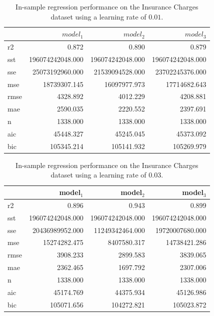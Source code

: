 \documentclass[11pt]{article}
\begin{document}
\begin{table}[H]
\centering
\caption{In-sample regression performance on the Insurance Charges dataset using a learning rate of $0.01$.}
\label{tab:California_Housing_(In-Sample)}
\begin{tabular}{lrrr}
\toprule
 & $model_1$ & $model_2$ & $model_3$ \\
\midrule
r2 & 0.872 & 0.890 & 0.879 \\
sst & 196074242048.000 & 196074242048.000 & 196074242048.000 \\
sse & 25073192960.000 & 21539094528.000 & 23702245376.000 \\
mse & 18739307.145 & 16097977.973 & 17714682.643 \\
rmse & 4328.892 & 4012.229 & 4208.881 \\
mae & 2590.035 & 2220.552 & 2397.691 \\
n & 1338.000 & 1338.000 & 1338.000 \\
aic & 45448.327 & 45245.045 & 45373.092 \\
bic & 105345.214 & 105141.932 & 105269.979 \\
\bottomrule
\end{tabular}
\end{table}


\begin{table}[H]
\centering
\caption{In-sample regression performance on the Insurance Charges dataset using a learning rate of $0.03$.}
\label{tab:Auto_MPG_(In-Sample)}
\begin{tabular}{lrrr}
\toprule
 & model$_1$ & model$_2$ & model$_3$ \\
\midrule
r2 & 0.896 & 0.943 & 0.899 \\
sst & 196074242048.000 & 196074242048.000 & 196074242048.000 \\
sse & 20436989952.000 & 11249342464.000 & 19720007680.000 \\
mse & 15274282.475 & 8407580.317 & 14738421.286 \\
rmse & 3908.233 & 2899.583 & 3839.065 \\
mae & 2362.465 & 1697.792 & 2307.006 \\
n & 1338.000 & 1338.000 & 1338.000 \\
aic & 45174.769 & 44375.934 & 45126.986 \\
bic & 105071.656 & 104272.821 & 105023.872 \\
\bottomrule
\end{tabular}
\end{table}
\end{document}

